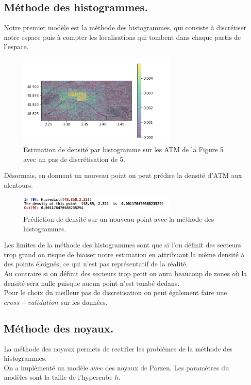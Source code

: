 \documentclass{article}
\begin{document}
\subsection{Méthode des histogrammes.}
Notre premier modèle est la méthode des histogrammes, qui consiste à discrétiser notre espace puis à compter les localisations qui tombent dans chaque partis de l'espace.\\
\begin{figure}[h]
	\center
	\includegraphics[width=8cm]{figure/tme2/atmHistogrammePas=5.png} 
	 \caption{Estimation de densité par histogramme sur les ATM de la Figure 5 avec un pas de discrétisation de 5. }
	 
\end{figure}
Désormais, en donnant un nouveau point on peut prédire la densité d'ATM aux alentours.

\begin{figure}[h]
	\center
	\includegraphics[width=8cm]{figure/tme2/predictHistogrammePas=5.png} 
	 \caption{Prédiction de densité sur un nouveau point avec la méthode des histogrammes. }
	 
\end{figure}
Les limites de la méthode des histogrammes sont que si l'on définit des secteurs trop grand on risque de biaiser notre estimation en attribuant la même densité à des points éloignés, ce qui n'est pas représentatif de la réalité.\\Au contraire si on définit des secteurs trop petit on aura beaucoup de zones où la densité sera nulle puisque aucun point n'est tombé dedans.\\ Pour le choix du meilleur pas de discretisation on peut également faire une $cross-validation$ sur les données.
\subsection{Méthode des noyaux.}
La méthode des noyaux permets de rectifier les problèmes de la méthode des histogrammes. \\ On a implémenté un modèle avec des noyaux de Parzen. Les paramètres du modèles sont la taille de l'hypercube $h$.
\end{document}
